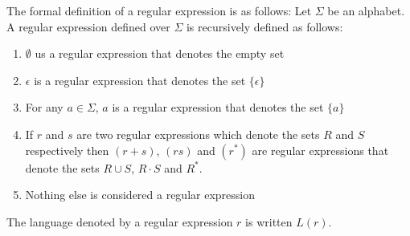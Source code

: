 The formal definition of a regular expression is as follows: Let $\Sigma$ be an alphabet.
A regular expression defined over $\Sigma$ is recursively defined as follows:
\begin{enumerate}
  \item $\emptyset$ us a regular expression that denotes the empty set
  \item $\epsilon$ is a regular expression that denotes the set $\{\epsilon\}$
  \item For any $a \in \Sigma$, $a$ is a regular expression that denotes the set $\{a\}$
  \item If $r$ and $s$ are two regular expressions which denote the sets $R$ and $S$ respectively
        then $(r + s)$, $(rs)$ and $(r^{*})$ are regular expressions that denote the sets
        $R \cup S$, $R \cdot S$ and $R^{*}$.
  \item Nothing else is considered a regular expression
\end{enumerate}
The language denoted by a regular expression $r$ is written $L(r)$.\\

